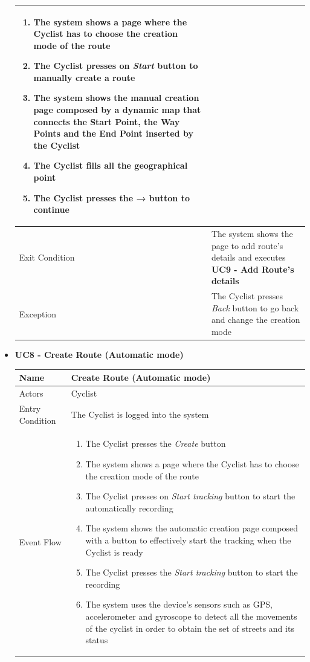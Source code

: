 \begin{itemize}
\begin{tabular}{|p{7cm}|p{7cm}|}
\begin{enumerate}
    \item The system shows a page where the Cyclist has to choose the creation mode of the route
    \item The Cyclist presses on \textit{Start} button to manually create a route
    \item The system shows the manual creation page composed by a dynamic map that connects the Start Point, the Way Points and the End Point inserted by the Cyclist
    \item The Cyclist fills all the geographical point
    \item The Cyclist presses the \textbf{→} button to continue
\end{enumerate}
\\ \hline
Exit Condition  & The system shows the page to add route’s details and executes \textbf{UC9 - Add Route’s details} \\ \hline
Exception       & The Cyclist presses \textit{Back} button to go back and change the creation mode
\\ \hline
\end{tabular}
\newpage
\item \textbf{UC8 - Create Route (Automatic mode)}\par\smallskip
\noindent
\begin{tabular}{|p{7cm}|p{7cm}|}
\hline
Name            & Create Route (Automatic mode) \\ \hline
Actors          & Cyclist \\ \hline
Entry Condition & The Cyclist is logged into the system \\ \hline
Event Flow      &
\begin{enumerate}
    \item The Cyclist presses the \textit{Create} button
    \item The system shows a page where the Cyclist has to choose the creation mode of the route
    \item The Cyclist presses on \textit{Start tracking} button to start the automatically recording
    \item The system shows the automatic creation page composed with a button to effectively start the tracking when the Cyclist is ready
    \item The Cyclist presses the \textit{Start tracking} button to start the recording
    \item The system uses the device's sensors such as GPS, accelerometer and gyroscope to detect all the movements of the cyclist in order to obtain the set of streets and its status

\end{enumerate}
\end{tabular}
\end{itemize}
